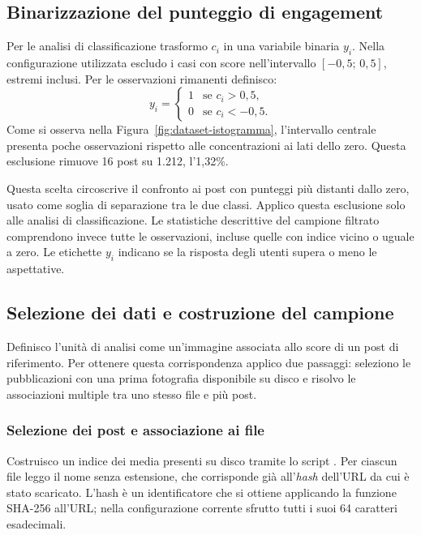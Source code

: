 \subsection{Binarizzazione del punteggio di engagement}
\label{sec:dataset-binarizzazione}

Per le analisi di classificazione trasformo $c_i$ in una variabile binaria $y_i$. Nella configurazione utilizzata escludo i casi con score nell'intervallo $[-0{,}5;\,0{,}5]$, estremi inclusi. Per le osservazioni rimanenti definisco:
\begin{equation}
    y_i =
    \begin{cases}
        1 & \text{se } c_i > 0{,}5, \\
        0 & \text{se } c_i < -0{,}5.
    \end{cases}
    \label{eq:dataset-target}
\end{equation}
Come si osserva nella Figura~\ref{fig:dataset-istogramma}, l'intervallo centrale presenta poche osservazioni rispetto alle concentrazioni ai lati dello zero. Questa esclusione rimuove 16 post su 1.212, l'1,32\%.

Questa scelta circoscrive il confronto ai post con punteggi più distanti dallo zero, usato come soglia di separazione tra le due classi. Applico questa esclusione solo alle analisi di classificazione. Le statistiche descrittive del campione filtrato comprendono invece tutte le osservazioni, incluse quelle con indice vicino o uguale a zero. Le etichette $y_i$ indicano se la risposta degli utenti supera o meno le aspettative.

\subsection{Selezione dei dati e costruzione del campione}
\label{sec:dataset-selezione}

Definisco l'unità di analisi come un'immagine associata allo score di un post di riferimento. Per ottenere questa corrispondenza applico due passaggi: seleziono le pubblicazioni con una prima fotografia disponibile su disco e risolvo le associazioni multiple tra uno stesso file e più post.

\subsubsection{Selezione dei post e associazione ai file}
\label{subsec:dataset-filtraggio}

Costruisco un indice dei media presenti su disco tramite lo script . Per ciascun file leggo il nome senza estensione, che corrisponde già all'\emph{hash} dell'URL da cui è stato scaricato. L'hash è un identificatore che si ottiene applicando la funzione SHA-256 all'URL; nella configurazione corrente sfrutto tutti i suoi 64 caratteri esadecimali.

